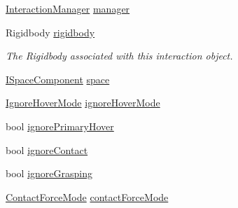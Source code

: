 \begin{DoxyCompactItemize}
\mbox{\hyperlink{class_leap_1_1_unity_1_1_interaction_1_1_interaction_manager}{Interaction\+Manager}} \mbox{\hyperlink{class_leap_1_1_unity_1_1_interaction_1_1_interaction_behaviour_af612da311eae4f7df7becea9aae8f7b7}{manager}}
\item 
Rigidbody \mbox{\hyperlink{class_leap_1_1_unity_1_1_interaction_1_1_interaction_behaviour_a4f54f1794944882d8cf51bd641a5341c}{rigidbody}}
\begin{DoxyCompactList}\small\item\em The Rigidbody associated with this interaction object. \end{DoxyCompactList}\item 
\mbox{\hyperlink{interface_leap_1_1_unity_1_1_space_1_1_i_space_component}{I\+Space\+Component}} \mbox{\hyperlink{class_leap_1_1_unity_1_1_interaction_1_1_interaction_behaviour_a2823985d77f87e529feddc58eeb6f8be}{space}}
\item 
\mbox{\hyperlink{namespace_leap_1_1_unity_1_1_interaction_aba04c439c84829d617115cfd977cb11b}{Ignore\+Hover\+Mode}} \mbox{\hyperlink{class_leap_1_1_unity_1_1_interaction_1_1_interaction_behaviour_a13a3ff7a2e319c7a4e415dc4b7da052b}{ignore\+Hover\+Mode}}
\item 
bool \mbox{\hyperlink{class_leap_1_1_unity_1_1_interaction_1_1_interaction_behaviour_a287792702f19db84262b36640c2f93c3}{ignore\+Primary\+Hover}}
\item 
bool \mbox{\hyperlink{class_leap_1_1_unity_1_1_interaction_1_1_interaction_behaviour_a812f158ddaabca6dd198c7133afcc486}{ignore\+Contact}}
\item 
bool \mbox{\hyperlink{class_leap_1_1_unity_1_1_interaction_1_1_interaction_behaviour_a94a7c385babbf711ca62ec73b5aab02a}{ignore\+Grasping}}
\item 
\mbox{\hyperlink{namespace_leap_1_1_unity_1_1_interaction_a7a6c3499f7b7d02b0d389e8ac72a315f}{Contact\+Force\+Mode}} \mbox{\hyperlink{class_leap_1_1_unity_1_1_interaction_1_1_interaction_behaviour_a1a9f67ccbde4ca471e36e9a0da9a3b83}{contact\+Force\+Mode}}

\end{DoxyCompactItemize}
